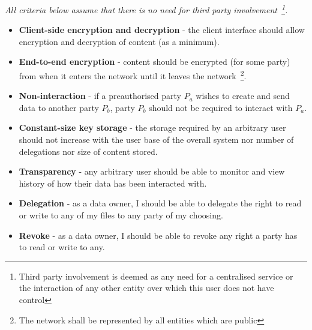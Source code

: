 \textit{All criteria below assume that there is no need for third party involvement~\footnote{Third party involvement is deemed as any need for a centralised service  or the interaction of any other entity over which this user does not have control}.}

\begin{itemize}
\item \textbf{Client-side encryption and decryption} - the client interface should allow encryption and decryption of content (as a minimum).
\item \textbf{End-to-end encryption} - content should be encrypted (for some party) from when it enters the network until it leaves the network~\footnote{The network shall be represented by all entities which are public}.
\item \textbf{Non-interaction} - if a preauthorised party $P_a$ wishes to create and send data to another party $P_b$, party $P_b$ should not be required to interact with $P_a$.
\item \textbf{Constant-size key storage} - the storage required by an arbitrary user should not increase with the user base of the overall system nor number of delegations nor size of content stored.
\item \textbf{Transparency} - any arbitrary user should be able to monitor and view history of how their data has been interacted with.
\item \textbf{Delegation} - as a data owner, I should be able to delegate the right to read or write to any of my files to any party of my choosing.
\item \textbf{Revoke} - as a data owner, I should be able to revoke any right a party has to read or write to any.
\end{itemize}
